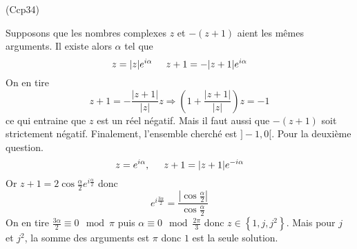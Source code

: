 \begin{tiny}(Ccp34)\end{tiny} Supposons que les nombres complexes $z$ et $-(z+1)$ aient les mêmes arguments. Il existe alors $\alpha$ tel que
\begin{displaymath}
 z = |z|e^{i\alpha}\hspace{0.5cm} z+1 = -|z+1|e^{i\alpha}
\end{displaymath}
On en tire 
\begin{displaymath}
 z+1 = -\frac{|z+1|}{|z|}z
\Rightarrow
\left( 1 + \frac{|z+1|}{|z|}\right) z = -1
\end{displaymath}
ce qui entraine que $z$ est un réel négatif. Mais il faut aussi que $-(z+1)$ soit strictement négatif. Finalement, l'ensemble cherché est $]-1,0[$.\newline
Pour la deuxième question.
\begin{displaymath}
 z=e^{i\alpha}, \hspace{0.5cm} z+1 = |z+1|e^{-i\alpha}
\end{displaymath}
Or $z+1 = 2\cos\frac{\alpha}{2}e^{i\frac{\alpha}{2}}$ donc
\begin{displaymath}
 e^{i\frac{3\alpha}{2}} = \frac{|\cos\frac{\alpha}{2}|}{\cos\frac{\alpha}{2}}
\end{displaymath}
On en tire $\frac{3\alpha}{2}\equiv 0 \mod \pi$ puis $\alpha \equiv 0 \mod \frac{2\pi}{3}$ donc $z\in\left\lbrace1, j , j^2 \right\rbrace$. Mais pour $j$ et $j^2$, la somme des arguments est $\pi$ donc $1$ est la seule solution.